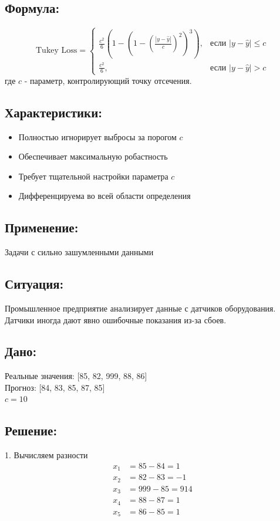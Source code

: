 \subsection*{Формула:}
\[
\text{Tukey Loss} =
\begin{cases}
\frac{c^2}{6} \left(1 - \left(1 - \left(\frac{|y - \hat{y}|}{c}\right)^2\right)^3\right), & \text{если } |y - \hat{y}| \leq c \\
\frac{c^2}{6}, & \text{если } |y - \hat{y}| > c
\end{cases}
\]
где $c$ - параметр, контролирующий точку отсечения.

\subsection*{Характеристики:}
\begin{itemize}
    \item Полностью игнорирует выбросы за порогом $c$
    \item Обеспечивает максимальную робастность
    \item Требует тщательной настройки параметра $c$
    \item Дифференцируема во всей области определения
\end{itemize}

\subsection*{Применение:} Задачи с сильно зашумленными данными

\subsection*{Ситуация:} Промышленное предприятие анализирует данные с датчиков оборудования. Датчики иногда дают явно ошибочные показания из-за сбоев.

\subsection*{Дано:}
Реальные значения: [85, 82, 999, 88, 86] \\
Прогноз: [84, 83, 85, 87, 85] \\
$c = 10$

\subsection*{Решение:}

1. Вычисляем разности
\begin{align*}
x_1 &= 85 - 84 = 1 \\
x_2 &= 82 - 83 = -1 \\
x_3 &= 999 - 85 = 914 \\
x_4 &= 88 - 87 = 1 \\
x_5 &= 86 - 85 = 1
\end{align*}

